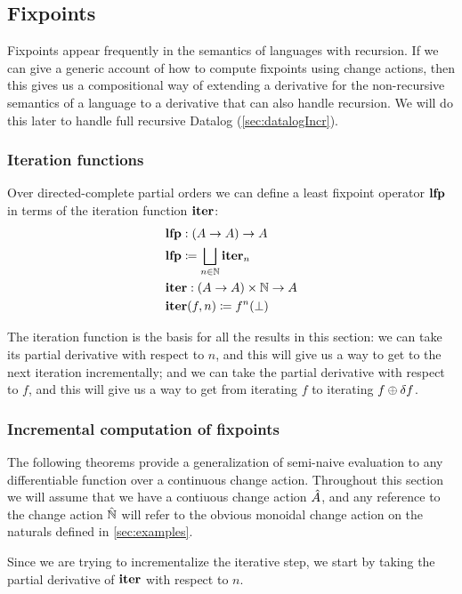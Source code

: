 \subsection{Fixpoints}
\label{sec:fixpoints}

Fixpoints appear frequently in the semantics of languages with recursion. If we
can give a generic account of how to compute fixpoints using change actions,
then this gives us a compositional way of extending a derivative for the
non-recursive semantics of a language to a derivative that can also handle recursion.
We will do this later to handle full recursive Datalog (\cref{sec:datalogIncr}).

\subsubsection{Iteration functions}
\label{sec:iteration}

Over directed-complete partial orders we can define a least fixpoint operator $\mathbf{lfp}$ in terms of the
iteration function $\mathbf{iter}$:
\begin{align*}
  &\mathbf{lfp} : (A \rightarrow A) \rightarrow A\\
  &\mathbf{lfp} \coloneqq \bigsqcup_{n \in \mathbb{N}} \mathbf{iter}_n \\
  &\mathbf{iter} : (A \rightarrow A) \times \mathbb{N} \rightarrow A\\
  &\mathbf{iter}(f, n) \coloneqq f^n(\bot)
\end{align*}

The iteration function is the basis for all the results in this section:
we can take its partial derivative with respect to $n$, and this will give us a way to get
to the next iteration incrementally; and we can take the partial derivative
with respect to $f$, and this will give us a way to get from iterating $f$ to iterating $f
\oplus \delta f$.

\subsubsection{Incremental computation of fixpoints}

The following theorems provide a
generalization of semi-naive evaluation to any differentiable function over a
continuous change action. Throughout this section we will assume that we have a contiuous change action
$\hat{A}$, and any reference to the change action $\hat{\mathbb{N}}$ will refer to the obvious monoidal
change action on the naturals defined in \cref{sec:examples}.

Since we are trying to incrementalize the iterative step, we start by taking the partial
derivative of $\mathbf{iter}$ with respect to $n$.

